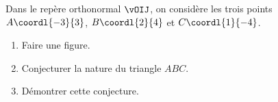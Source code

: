 \begin{exo}{}
	Dans le repère orthonormal $\vOIJ$, on considère les trois points $A\coordl{-3}{3}$, $B\coordl{2}{4}$ et $C\coordl{1}{-4}$.

	\begin{enumerate}
		\item Faire une figure.
		\item Conjecturer la nature du triangle $ABC$.
		\item Démontrer cette conjecture.
	\end{enumerate}
\end{exo}
